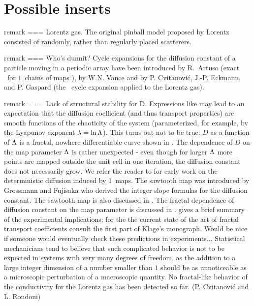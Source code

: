 \section{Possible inserts}

remark === {Lorentz gas.}{
The original pinball model proposed by Lorentz consisted
of randomly, rather than regularly placed scatterers.
} %
%

remark === {Who's dunnit?}{
Cycle expansions for the diffusion constant of a particle
moving in a periodic array have been introduced
by R.~Artuso (exact
\dzeta\ for $1$\dmn\ chains of maps  ),
by W.N. Vance%
\PublicPrivate{,}{%
(the trace formula \refeq{DL-trace} for the Lorentz gas),
      }%
and by
P. Cvitanovi\'c, J.-P. Eckmann, and P. Gaspard
(the \dzeta\ cycle expansion  applied to the  Lorentz gas).
} %

remark === {Lack of structural stability for D.}{
Expressions like  may lead to an expectation that
the diffusion coefficient (and thus transport properties) are
smooth functions of the chaoticity of the system
(parameterized, for example, by the Lyapunov exponent $\lambda =
\ln \Lambda$). This turns out not to be true: $D$ as a
function of $\Lambda$ is a fractal, nowhere differentiable
curve shown in . The dependence of $D$ on the
map parameter $\Lambda$ is rather unexpected - even though for
larger $\Lambda$ more points are mapped outside the unit cell
in one iteration, the diffusion constant does not necessarily
grow. We refer the reader to  for
early work on the deterministic diffusion induced by 1\dmn\
maps. The sawtooth map  was introduced by
Grossmann and Fujisaka who derived the integer slope
formulas \refeq{D-KD} for the diffusion constant. The sawtooth
map is also discussed in . The fractal dependence
of diffusion constant on the map parameter is discussed in
.  gives
a brief summary of the experimental implications; for the the
current state of the art of fractal transport coefficients consult
the first part of Klage's monograph\rf{RKbook07}. Would be nice if
someone would eventually check these predictions in
experiments...
Statistical
mechanicians tend to believe that such complicated behavior is
not to be expected in systems with very many degrees of
freedom, as the addition to a large integer dimension of a
number smaller than $1$ should be as unnoticeable as a
microscopic perturbation of a macroscopic quantity. No
fractal-like behavior of the conductivity for the Lorentz gas
has been detected so far.
\hfill (P. Cvitanovi\'c and L. Rondoni)
} %

